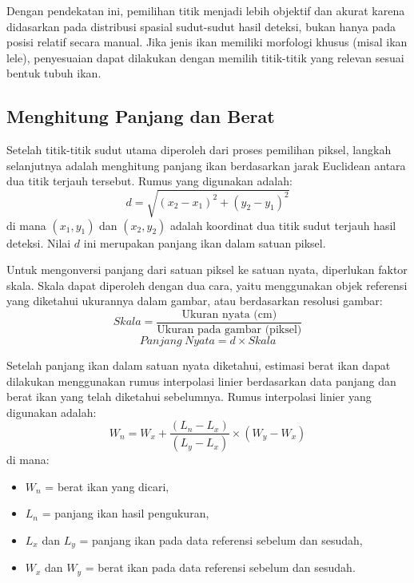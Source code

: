     Dengan pendekatan ini, pemilihan titik menjadi lebih objektif dan akurat karena didasarkan pada distribusi spasial sudut-sudut hasil deteksi, bukan hanya pada posisi relatif secara manual. Jika jenis ikan memiliki morfologi khusus (misal ikan lele), penyesuaian dapat dilakukan dengan memilih titik-titik yang relevan sesuai bentuk tubuh ikan.
\subsection{Menghitung Panjang dan Berat}
    Setelah titik-titik sudut utama diperoleh dari proses pemilihan piksel, langkah selanjutnya adalah menghitung panjang ikan berdasarkan jarak Euclidean antara dua titik terjauh tersebut. Rumus yang digunakan adalah:
\begin{equation}
    d = \sqrt{(x_2 - x_1)^2 + (y_2 - y_1)^2}
\end{equation}
    di mana \((x_1, y_1)\) dan \((x_2, y_2)\) adalah koordinat dua titik sudut terjauh hasil deteksi. Nilai \(d\) ini merupakan panjang ikan dalam satuan piksel.

    Untuk mengonversi panjang dari satuan piksel ke satuan nyata, diperlukan faktor skala. Skala dapat diperoleh dengan dua cara, yaitu menggunakan objek referensi yang diketahui ukurannya dalam gambar, atau berdasarkan resolusi gambar:
\begin{equation*}
    Skala = \frac{\text{Ukuran nyata (cm)}}{\text{Ukuran pada gambar (piksel)}}
\end{equation*}
\begin{equation}
    Panjang\ Nyata = d \times Skala
\end{equation}

    Setelah panjang ikan dalam satuan nyata diketahui, estimasi berat ikan dapat dilakukan menggunakan rumus interpolasi linier berdasarkan data panjang dan berat ikan yang telah diketahui sebelumnya. Rumus interpolasi linier yang digunakan adalah:
\begin{equation}
    W_n = W_x + \frac{(L_n - L_x)}{(L_y - L_x)} \times (W_y - W_x)
\end{equation}
    di mana:
\begin{itemize}
    \item \(W_n\) = berat ikan yang dicari,
    \item \(L_n\) = panjang ikan hasil pengukuran,
    \item \(L_x\) dan \(L_y\) = panjang ikan pada data referensi sebelum dan sesudah,
    \item \(W_x\) dan \(W_y\) = berat ikan pada data referensi sebelum dan sesudah.
\end{itemize}

